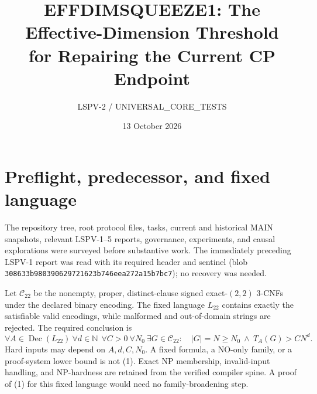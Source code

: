 \documentclass[11pt]{article}
\title{EFFDIMSQUEEZE1: The Effective-Dimension Threshold\\for Repairing the Current CP Endpoint}
\author{LSPV-2 / UNIVERSAL\_CORE\_TESTS}
\date{13 October 2026}
\newcommand{\Ltwo}{L_{22}}
\begin{document}
\maketitle

\begin{center}
\end{center}

\section{Preflight, predecessor, and fixed language}
The repository tree, root protocol files, tasks, current and historical MAIN
snapshots, relevant LSPV-1--5 reports, governance, experiments, and causal
explorations were surveyed before substantive work.  The immediately
preceding LSPV-1 report
was read with its required header and sentinel (blob
\texttt{308633b980390629721623b746eea272a15b7bc7}); no recovery was needed.

Let \(\mathcal C_{22}\) be the nonempty, proper, distinct-clause signed
exact-\((2,2)\) 3-CNFs under the declared binary encoding.  The fixed language
\(\Ltwo\) contains exactly the satisfiable valid encodings, while malformed
and out-of-domain strings are rejected.  The required conclusion is
\[
 \forall A\in\operatorname{Dec}(\Ltwo)\ \forall d\in\mathbb N\
 \ \forall C>0\ \forall N_0\ \exists G\in\mathcal C_{22}:\quad
 |G|=N\ge N_0\ \land\ T_A(G)>CN^d .                       \tag{1}
\]
Hard inputs may depend on \(A,d,C,N_0\).  A fixed formula, a NO-only family,
or a proof-system lower bound is not (1).  Exact NP membership, invalid-input
handling, and NP-hardness are retained from the verified compiler spine.  A
proof of (1) for this fixed language would need no family-broadening step.
\end{document}
